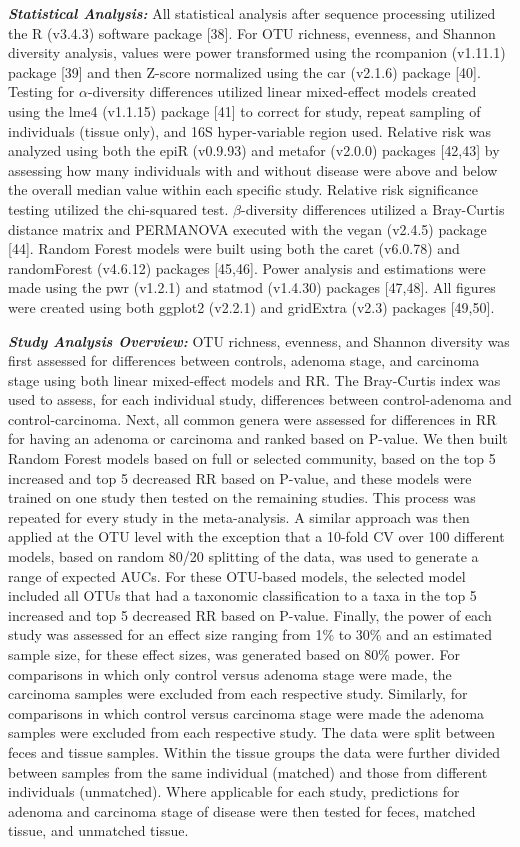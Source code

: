 \documentclass[12pt,]{article}
\begin{document}
\textbf{\emph{Statistical Analysis:}} All statistical analysis after
sequence processing utilized the R (v3.4.3) software package {[}38{]}.
For OTU richness, evenness, and Shannon diversity analysis, values were
power transformed using the rcompanion (v1.11.1) package {[}39{]} and
then Z-score normalized using the car (v2.1.6) package {[}40{]}. Testing
for \(\alpha\)-diversity differences utilized linear mixed-effect models
created using the lme4 (v1.1.15) package {[}41{]} to correct for study,
repeat sampling of individuals (tissue only), and 16S hyper-variable
region used. Relative risk was analyzed using both the epiR (v0.9.93)
and metafor (v2.0.0) packages {[}42,43{]} by assessing how many
individuals with and without disease were above and below the overall
median value within each specific study. Relative risk significance
testing utilized the chi-squared test. \(\beta\)-diversity differences
utilized a Bray-Curtis distance matrix and PERMANOVA executed with the
vegan (v2.4.5) package {[}44{]}. Random Forest models were built using
both the caret (v6.0.78) and randomForest (v4.6.12) packages
{[}45,46{]}. Power analysis and estimations were made using the pwr
(v1.2.1) and statmod (v1.4.30) packages {[}47,48{]}. All figures were
created using both ggplot2 (v2.2.1) and gridExtra (v2.3) packages
{[}49,50{]}.

\textbf{\emph{Study Analysis Overview:}} OTU richness, evenness, and
Shannon diversity was first assessed for differences between controls,
adenoma stage, and carcinoma stage using both linear mixed-effect models
and RR. The Bray-Curtis index was used to assess, for each individual
study, differences between control-adenoma and control-carcinoma. Next,
all common genera were assessed for differences in RR for having an
adenoma or carcinoma and ranked based on P-value. We then built Random
Forest models based on full or selected community, based on the top 5
increased and top 5 decreased RR based on P-value, and these models were
trained on one study then tested on the remaining studies. This process
was repeated for every study in the meta-analysis. A similar approach
was then applied at the OTU level with the exception that a 10-fold CV
over 100 different models, based on random 80/20 splitting of the data,
was used to generate a range of expected AUCs. For these OTU-based
models, the selected model included all OTUs that had a taxonomic
classification to a taxa in the top 5 increased and top 5 decreased RR
based on P-value. Finally, the power of each study was assessed for an
effect size ranging from 1\% to 30\% and an estimated sample size, for
these effect sizes, was generated based on 80\% power. For comparisons
in which only control versus adenoma stage were made, the carcinoma
samples were excluded from each respective study. Similarly, for
comparisons in which control versus carcinoma stage were made the
adenoma samples were excluded from each respective study. The data were
split between feces and tissue samples. Within the tissue groups the
data were further divided between samples from the same individual
(matched) and those from different individuals (unmatched). Where
applicable for each study, predictions for adenoma and carcinoma stage
of disease were then tested for feces, matched tissue, and unmatched
tissue.
\end{document}
